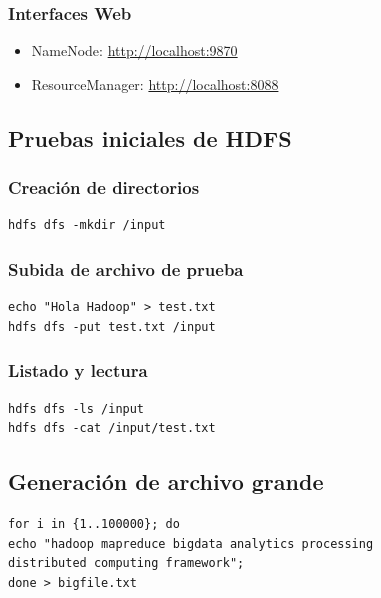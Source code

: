 \subsubsection*{Interfaces Web}

\begin{itemize}
    \item NameNode: \url{http://localhost:9870}
    \item ResourceManager: \url{http://localhost:8088}
\end{itemize}

\subsection{Pruebas iniciales de HDFS}

\subsubsection*{Creación de directorios}

\begin{verbatim}
hdfs dfs -mkdir /input
\end{verbatim}

\subsubsection*{Subida de archivo de prueba}

\begin{verbatim}
echo "Hola Hadoop" > test.txt
hdfs dfs -put test.txt /input
\end{verbatim}

\subsubsection*{Listado y lectura}

\begin{verbatim}
hdfs dfs -ls /input
hdfs dfs -cat /input/test.txt
\end{verbatim}

\subsection{Generación de archivo grande}

\begin{verbatim}
for i in {1..100000}; do
echo "hadoop mapreduce bigdata analytics processing 
distributed computing framework";
done > bigfile.txt
\end{verbatim}

